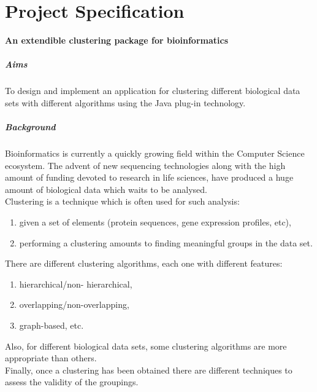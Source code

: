 \documentclass[]{final_report}
\begin{document}

\chapter*{Project Specification}

\textbf{An extendible clustering package for bioinformatics}

\paragraph{Aims}
To design and implement an application for clustering different biological data sets with different algorithms using the Java plug-in technology.

\paragraph{Background}
Bioinformatics is currently a quickly growing field within the Computer Science ecosystem. The advent of new sequencing technologies along with the high amount of funding devoted to research in life sciences, have produced a huge amount of biological data which waits to be analysed.\\
Clustering is a technique which is often used for such analysis:  \begin{enumerate}
 \item given a set of elements (protein sequences, gene expression profiles, etc),
 \item performing a clustering amounts to finding meaningful groups in the data set.
\end{enumerate}
 There are different clustering algorithms, each one with different features: 
\begin{enumerate}
 \item hierarchical/non- hierarchical,
 \item overlapping/non-overlapping,
 \item graph-based, etc.
\end{enumerate}
 Also, for different biological data sets, some clustering algorithms are more appropriate than others. \\
 Finally, once a clustering has been obtained there are different techniques to assess the validity of the groupings.
\end{document}
